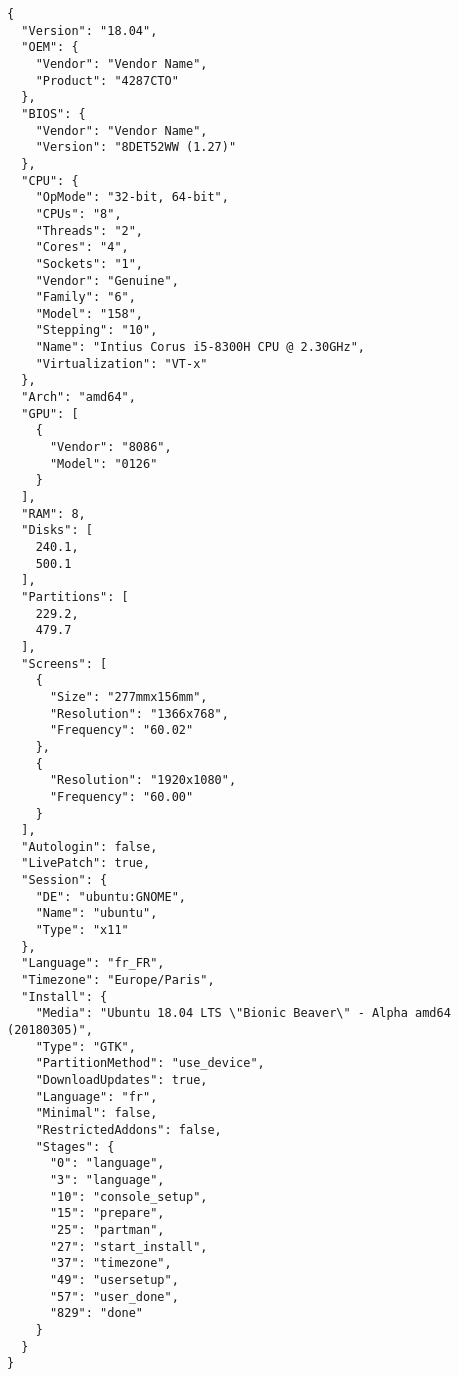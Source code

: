 \newpage

\begin{lstlisting}[label=lst:ubuntu-report, caption=Example report for an Ubuntu X86\_64 System\cite{roche_ubuntuubuntu-report_2020}]
{
  "Version": "18.04",
  "OEM": {
    "Vendor": "Vendor Name",
    "Product": "4287CTO"
  },
  "BIOS": {
    "Vendor": "Vendor Name",
    "Version": "8DET52WW (1.27)"
  },
  "CPU": {
    "OpMode": "32-bit, 64-bit",
    "CPUs": "8",
    "Threads": "2",
    "Cores": "4",
    "Sockets": "1",
    "Vendor": "Genuine",
    "Family": "6",
    "Model": "158",
    "Stepping": "10",
    "Name": "Intius Corus i5-8300H CPU @ 2.30GHz",
    "Virtualization": "VT-x"
  },
  "Arch": "amd64",
  "GPU": [
    {
      "Vendor": "8086",
      "Model": "0126"
    }
  ],
  "RAM": 8,
  "Disks": [
    240.1,
    500.1
  ],
  "Partitions": [
    229.2,
    479.7
  ],
  "Screens": [
    {
      "Size": "277mmx156mm",
      "Resolution": "1366x768",
      "Frequency": "60.02"
    },
    {
      "Resolution": "1920x1080",
      "Frequency": "60.00"
    }
  ],
  "Autologin": false,
  "LivePatch": true,
  "Session": {
    "DE": "ubuntu:GNOME",
    "Name": "ubuntu",
    "Type": "x11"
  },
  "Language": "fr_FR",
  "Timezone": "Europe/Paris",
  "Install": {
    "Media": "Ubuntu 18.04 LTS \"Bionic Beaver\" - Alpha amd64 (20180305)",
    "Type": "GTK",
    "PartitionMethod": "use_device",
    "DownloadUpdates": true,
    "Language": "fr",
    "Minimal": false,
    "RestrictedAddons": false,
    "Stages": {
      "0": "language",
      "3": "language",
      "10": "console_setup",
      "15": "prepare",
      "25": "partman",
      "27": "start_install",
      "37": "timezone",
      "49": "usersetup",
      "57": "user_done",
      "829": "done"
    }
  }
}
\end{lstlisting}